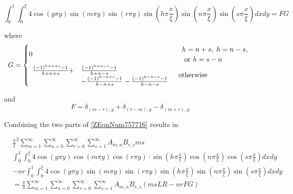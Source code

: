 \begin{equation*}
    \int _{0}^{1} \int _{0}^{\xi} 4 \cos \left(g\pi y\right)
    \sin \left(m \pi y\right) \sin \left(r \pi y\right) 
    \sin \left(h \pi \frac{x}{\xi } \right)
    \sin \left(n \pi \frac{x}{\xi } \right)
    \sin \left(s\pi \frac{x}{\xi } \right) dxdy
    = FG
\end{equation*}

where
\begin{equation} \label{ZEqnNum668374} 
    G = \begin{cases} 0 & \begin{array}{l} 
        h = n + s , \; h = n - s, \\ 
        \text{ or } h = s - n
    \end{array} \\ \begin{array}{ll} 
        \frac{\left(-1\right)^{h + n + s} - 1}{h + n + s}  
       + & \frac{\left(-1\right)^{h + n - s} - 1}{h + n - s} \\
       & - \frac{\left(-1\right)^{h - n + s} - 1}{h - n + s} 
        - \frac{\left(-1\right)^{h - n - s} - 1}{h - n - s}
    \end{array} & \text{otherwise} \end{cases} 
\end{equation}

and
\begin{equation} \label{3.36)} 
    F = \delta _{\left(m-r\right),g} 
    + \delta_{\left(r-m\right),g} - \delta _{\left(m + r\right), g} 
\end{equation}

Combining the two parts of \eqref{ZEqnNum757716} results in

\begin{equation} \label{3.37)} \begin{split} 
    & \frac{\pi }{\xi } ^{2} 
    \sum_{m=1}^{\infty } \sum _{n=0}^{\infty } \sum _{r=0}^{\infty } \sum _{s=1}^{\infty}
        A_{m,n} B_{r,s} m s \\
        & \int _{0}^{1} \int _{0}^{\xi} 4\cos \left(g \pi y\right) \cos \left(m\pi y\right)
            \cos \left(r\pi y\right) \cdot \sin \left( h\pi \frac{x}{\xi } \right)
            \cos \left(n\pi \frac{x}{\xi } \right)
            \cos \left(s\pi \frac{x}{\xi } \right) dxdy \\ 
        & - nr \int_{0}^{1} \int_{0}^{\xi} 4 \cos \left(g \pi y\right) \sin \left(m\pi y\right) 
            \sin \left(r \pi y\right) \sin \left(h\pi \frac{x}{\xi} \right) 
            \sin \left(n\pi \frac{x}{\xi } \right) \sin \left(s\pi \frac{x}{\xi} \right) dxdy \\
    & = \frac{\pi}{4} \sum _{m = 1}^{\infty} \sum_{n=0}^{\infty } \sum _{r=0}^{\infty } \sum _{s=1}^{\infty } 
        A_{m,n} B_{r,s} \left(msLR - nrFG\right)
\end{split} \end{equation} 

